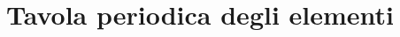 \documentclass[a4paper,11pt,italian]{article}
\begin{document}
%
%
%
\newpage
\section{Tavola periodica degli elementi}

\end{document}
